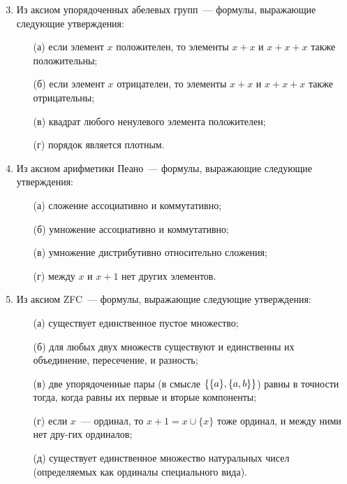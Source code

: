 \documentclass[a4paper,11pt]{article}
\begin{document}
\begin{enumerate} \setcounter{enumi}{2}
	\item Из аксиом упорядоченных абелевых групп~— формулы, выражающие следующие утверждения: \begin{enumerate}
	\item[(а)] если элемент $x$ положителен, то элементы $x+x$ и $x+x+x$ также положительны;
	\item[(б)] если элемент $x$ отрицателен, то элементы $x+x$ и $x+x+x$ также отрицательны;
	\item[(в)] квадрат любого ненулевого элемента положителен;
	\item[(г)] порядок является плотным. 
	\end{enumerate}

	\item Из аксиом арифметики Пеано~— формулы, выражающие следующие утверждения: \begin{enumerate}
	\item[(а)] сложение ассоциативно и коммутативно;
	\item[(б)] умножение ассоциативно и коммутативно;
	\item[(в)] умножение дистрибутивно относительно сложения;
	\item[(г)] между $x$ и $x+1$ нет других элементов.
	\end{enumerate}

	\item Из аксиом ZFC~— формулы, выражающие следующие утверждения: \begin{enumerate}
	\item[(а)] существует единственное пустое множество;
	\item[(б)] для любых двух множеств существуют и единственны их объединение, пересечение, и разность;
	\item[(в)] две упорядоченные пары (в смысле \(\set*{\set*{a}, \set*{a,b}}\)) равны в точности тогда, когда равны их первые и вторые компоненты;
	\item[(г)] если  $x$~— ординал, то  $x+1=x\cup\{x\}$ тоже ординал, и между ними нет дру-\linebreak гих ординалов;
	\item[(д)] существует единственное множество натуральных чисел (определяемых как ординалы специального вида).
	\end{enumerate}
\end{enumerate}
\end{document}
